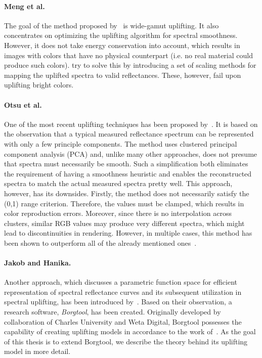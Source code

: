 \paragraph{Meng et al.} The goal of the method proposed by~\citet{upsamplingMeng} is wide-gamut uplifting. It also concentrates on optimizing the uplifting algorithm for spectral smoothness. However, it does not take energy conservation into account, which results in images with colors that have no physical counterpart (i.e. no real material could produce such colors). \citet{upsamplingMeng} try to solve this by introducing a set of scaling methods for mapping the uplifted spectra to valid reflectances. These, however, fail upon uplifting bright colors. 

\paragraph{Otsu et al.} One of the most recent uplifting techniques has been proposed by~\citet{upsamplingOtsu}. It is based on the observation that a typical measured reflectance spectrum can be represented with only a few principle components. The method uses clustered principal component analysis (PCA) and, unlike many other approaches, does not presume that spectra must necessarily be smooth. Such a simplification both eliminates the requirement of having a smoothness heuristic and enables the reconstructed spectra to match the actual measured spectra pretty well. This approach, however, has its downsides. Firstly, the method does not necessarily satisfy the (0,1) range criterion. Therefore, the values must be clamped, which results in color reproduction errors. Moreover, since there is no interpolation across clusters, similar RGB values may produce very different spectra, which might lead to discontinuities in rendering. However, in multiple cases, this method has been shown to outperform all of the already mentioned ones~\cite{upsamplingJakobHanika}.

\paragraph{Jakob and Hanika.} Another approach, which discusses a parametric function space for efficient representation of spectral reflectance curves and its subsequent utilization in spectral uplifting, has been introduced by~\citet{upsamplingJakobHanika}. Based on their observation, a research software, \emph{Borgtool}, has been created. Originally developed by collaboration of Charles University and Weta Digital, Borgtool possesses the capability of creating uplifting models in accordance to the work of~\citet{upsamplingJakobHanika}. As the goal of this thesis is to extend Borgtool, we describe the theory behind its uplifting model in more detail.

